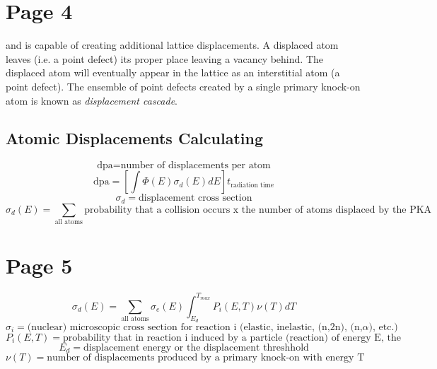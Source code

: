 \documentclass[11pt]{article}
\begin{document}
\section{Page 4}
and is capable of creating additional lattice displacements. A displaced atom leaves (i.e. a point defect) its proper place leaving a vacancy behind. The displaced atom will eventually appear in the lattice as an interstitial atom (a point defect). The ensemble of point defects created by a single primary knock-on atom is known as \textit{displacement cascade}.

\subsection{Atomic Displacements Calculating}
\begin{equation}
	\text{dpa} = \text{number of displacements per atom}
\end{equation}
\begin{equation}
	\text{dpa} = \left[ \int \Phi(E) \sigma_d (E) dE \right] t_{\text{radiation time}}
\end{equation}
\begin{equation}
	\sigma_d = \text{displacement cross section}
\end{equation}
\begin{equation}
	\sigma_d(E) = \sum_{\text{all atoms}} \text{probability that a collision occurs x the number of atoms displaced by the PKA}
\end{equation}

\section{Page 5}
\begin{equation}
	\sigma_d(E) = \sum_{\text{all atoms}} \sigma_e (E) \int_{E_d}^{T_{max}} P_i(E,T) \nu(T) dT
\end{equation}
\begin{equation}
	\sigma_i = \text{(nuclear) microscopic cross section for reaction i (elastic, inelastic, (n,2n), (n,$\alpha$), etc.)}
\end{equation}
\begin{equation}
	P_i(E,T) = \text{probability that in reaction i induced by a particle (reaction) of energy E, the PKA has a kinetic energy T}
\end{equation}
\begin{equation}
	E_d = \text{displacement energy or the displacement threshhold}
\end{equation}
\begin{equation}
	\nu(T) = \text{number of displacements produced by a primary knock-on with energy T}
\end{equation}
\end{document}
